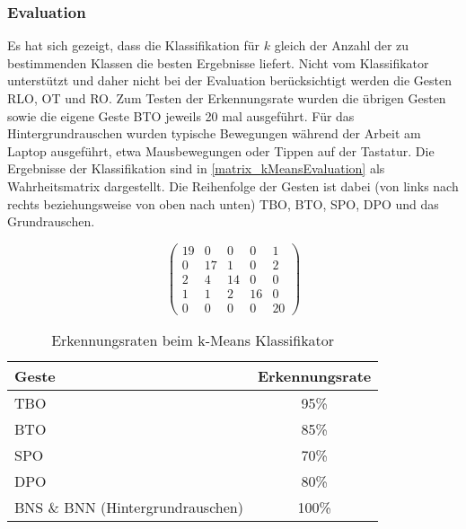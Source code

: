 \subsubsection{Evaluation}
Es hat sich gezeigt, dass die Klassifikation für $k$ gleich der Anzahl der zu bestimmenden Klassen die besten Ergebnisse liefert.  
Nicht vom Klassifikator unterstützt und daher nicht bei der Evaluation berücksichtigt werden die Gesten \ac{RLO}, \ac{OT} und \ac{RO}. Zum Testen der Erkennungsrate wurden die übrigen Gesten sowie die eigene Geste BTO jeweils 20 mal ausgeführt. Für das Hintergrundrauschen wurden typische Bewegungen während der Arbeit am Laptop ausgeführt, etwa Mausbewegungen oder Tippen auf der Tastatur. Die Ergebnisse der Klassifikation sind in  \autoref{matrix_kMeansEvaluation} als Wahrheitsmatrix dargestellt. Die Reihenfolge der Gesten ist dabei (von links nach rechts beziehungsweise von oben nach unten) \ac{TBO}, BTO, \ac{SPO}, \ac{DPO} und das Grundrauschen.

\begin{center}
\begin{equation}
\label{matrix_kMeansEvaluation}
\begin{pmatrix}
19 & 0 & 0 & 0 & 1\\
0 & 17 & 1 & 0 & 2\\
2 & 4 & 14 & 0 & 0\\
1 & 1 & 2 & 16 & 0\\
0 & 0 & 0 & 0 & 20
\end{pmatrix}
\end{equation}
\end{center}


\begin{table}[h]
\centering
\begin{tabular}{|p{}|c|}
\hline
 \textbf{Geste} & \textbf{Erkennungsrate} \\
 \hline
  \ac{TBO} & 95\% \\
 \hline
  BTO & 85\% \\
 \hline
  \ac{SPO} & 70\% \\
 \hline
  DPO & 80\% \\
 \hline
  \ac{BNS} \& \ac{BNN} (Hintergrund\-rauschen) & 100\%\\
 \hline
\end{tabular}
\caption[Erkennungsraten beim k-Means Klassifikator]{Erkennungsraten beim k-Means Klassifikator}
\label{tab:kMeansEvaluation}
\end{table}


